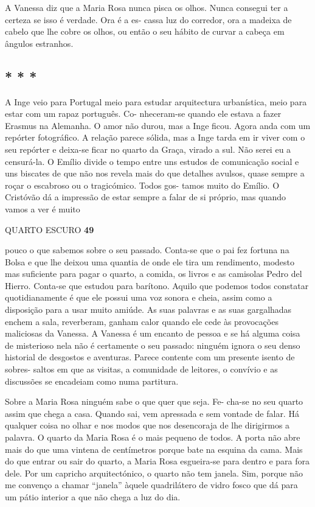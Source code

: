 A Vanessa diz que a Maria Rosa nunca pisca os olhos. Nunca consegui ter
a certeza se isso é verdade. Ora é a es- cassa luz do corredor, ora a
madeixa de cabelo que lhe cobre os olhos, ou então o seu hábito de
curvar a cabeça em ângulos estranhos.


\subsection{* * *}

A Inge veio para Portugal meio para estudar arquitectura urbanística,
meio para estar com um rapaz português. Co- nheceram-se quando ele
estava a fazer Erasmus na Alemanha. O amor não durou, mas a Inge ficou.
Agora anda com um repórter fotográfico. A relação parece sólida, mas a
Inge tarda em ir viver com o seu repórter e deixa-se ficar no quarto da
Graça, virado a sul. Não serei eu a censurá-la. O Emílio divide o tempo
entre uns estudos de comunicação social e uns biscates de que não nos
revela mais do que detalhes avulsos, quase sempre a roçar o escabroso ou
o tragicómico. Todos gos- tamos muito do Emílio. O Cristóvão dá a
impressão de estar sempre a falar de si próprio, mas quando vamos a ver
é muito

QUARTO ESCURO \textbf{49}

pouco o que sabemos sobre o seu passado. Conta-se que o pai fez fortuna
na Bolsa e que lhe deixou uma quantia de onde ele tira um rendimento,
modesto mas suficiente para pagar o quarto, a comida, os livros e as
camisolas Pedro del Hierro. Conta-se que estudou para barítono. Aquilo
que podemos todos constatar quotidianamente é que ele possui uma voz
sonora e cheia, assim como a disposição para a usar muito amiúde. As
suas palavras e as suas gargalhadas enchem a sala, reverberam, ganham
calor quando ele cede às provocações maliciosas da Vanessa. A Vanessa é
um encanto de pessoa e se há alguma coisa de misterioso nela não é
certamente o seu passado: ninguém ignora o seu denso historial de
desgostos e aventuras. Parece contente com um presente isento de sobres-
saltos em que as visitas, a comunidade de leitores, o convívio e as
discussões se encadeiam como numa partitura.

Sobre a Maria Rosa ninguém sabe o que quer que seja. Fe- cha-se no seu
quarto assim que chega a casa. Quando sai, vem apressada e sem vontade
de falar. Há qualquer coisa no olhar e nos modos que nos desencoraja de
lhe dirigirmos a palavra. O quarto da Maria Rosa é o mais pequeno de
todos. A porta não abre mais do que uma vintena de centímetros porque
bate na esquina da cama. Mais do que entrar ou sair do quarto, a Maria
Rosa esgueira-se para dentro e para fora dele. Por um capricho
arquitectónico, o quarto não tem janela. Sim, porque não me convenço a
chamar ``janela'' àquele quadrilátero de vidro fosco que dá para um
pátio interior a que não chega a luz do dia.

